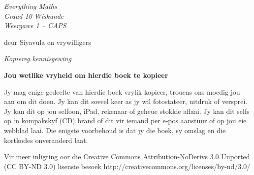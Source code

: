 


\begin{titlepage}
\begin{adjustwidth}{1in}{1in}
\begin{center}
    \thispagestyle{empty}

    \vspace*{4in}

    {\normalfont\sffamily\fontsize{36}\normalfont\itshape{Everything Maths } \\ \vspace*{1cm}
    {\normalfont\sffamily\fontsize{22}\normalfont\itshape{Graad 10 Wiskunde}}
    \vspace*{1in} \\
    \LARGE Weergawe 1 -- CAPS  \\

   {\vspace*{2in}
     deur Siyavula en vrywilligers 
  

\vfill

    }}
\end{center}
\end{adjustwidth}
\end{titlepage}






\newpage
\thispagestyle{empty}
{
\begin{center}
\normalfont\sffamily\fontsize{22}\normalfont\itshape  Kopiereg kennisgewing\\

\vspace*{1in}

\textbf{Jou wetlike vryheid om hierdie boek te kopieer}\\

\end{center}
}

{\large
Jy mag enige gedeelte van hierdie boek vrylik kopieer, trouens ons moedig jou aan om dit doen. Jy kan dit soveel keer as jy wil fotostateer, uitdruk of versprei. Jy kan dit op jou selfoon, iPad, rekenaar of geheue stokkie aflaai. Jy kan dit selfs op ‘n kompakskyf (CD) brand of dit vir iemand per e-pos aanstuur of op jou eie webblad laai.
Die enigste voorbehoud is dat jy die boek, sy omslag en die kortkodes onveranderd laat. \par

Vir meer inligting oor die Creative Commons Attribution-NoDerivs 3.0 Unported (CC BY-ND
3.0) lisensie besoek http://creativecommons.org/licenses/by-nd/3.0/}\\
 \pagestyle{empty}

